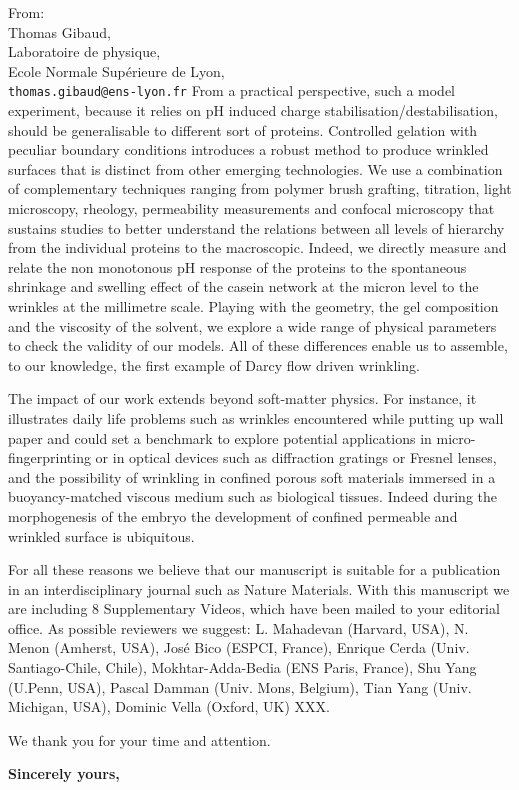 \documentclass[a4paper, parskip=true, firsthead=false, fromemail=true, foldmarks=false]{scrlttr2}
\begin{document}
\begin{letter}{From:\\
Thomas Gibaud,\\
Laboratoire de physique,\\
Ecole Normale Supérieure de Lyon,\\
\texttt{thomas.gibaud@ens-lyon.fr}
}
From a practical perspective, such a model experiment, because it relies on pH induced charge stabilisation/destabilisation, should be generalisable to different sort of proteins. Controlled gelation with peculiar boundary conditions introduces a robust method to produce wrinkled surfaces that is distinct from other emerging technologies. We use a combination of complementary techniques ranging from polymer brush grafting, titration, light microscopy, rheology, permeability measurements and confocal microscopy that sustains studies to better understand the relations between all levels of hierarchy from the individual proteins to the macroscopic. Indeed, we directly measure and relate the non monotonous pH response of the proteins to the spontaneous shrinkage and swelling effect of the casein network at the micron level to the wrinkles at the millimetre scale. Playing with the geometry, the gel composition and the viscosity of the solvent, we explore a wide range of physical parameters to check the validity of our models. All of these differences enable us to assemble, to our knowledge, the first example of Darcy flow driven wrinkling.

The impact of our work extends beyond soft-matter physics. For instance, it illustrates daily life problems such as wrinkles encountered while putting up wall paper and could set a benchmark to explore potential applications in micro-fingerprinting or in optical devices such as diffraction gratings or Fresnel lenses, and the possibility of wrinkling in confined porous soft materials immersed in a buoyancy-matched viscous medium such as biological tissues. Indeed during the morphogenesis of the embryo the development of confined permeable and wrinkled surface is ubiquitous.


For all these reasons we believe that our manuscript is suitable for a publication in an interdisciplinary journal such as Nature Materials. With this manuscript we are including 8 Supplementary Videos, which have been mailed to your editorial office. As possible reviewers we suggest: L. Mahadevan (Harvard, USA), N. Menon (Amherst, USA), José Bico (ESPCI, France), Enrique Cerda (Univ. Santiago-Chile, Chile), Mokhtar-Adda-Bedia (ENS Paris, France), Shu Yang (U.Penn, USA), Pascal Damman (Univ. Mons, Belgium), Tian Yang (Univ. Michigan, USA), Dominic Vella (Oxford, UK) XXX.

 

We thank you for your time and attention.

\closing{\bf Sincerely yours,} 

\end{letter} 
\end{document}
